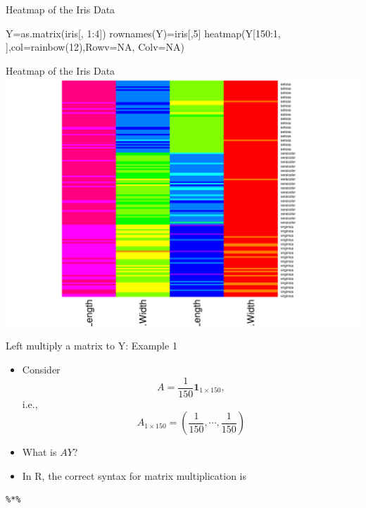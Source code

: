 \documentclass[
  ignorenonframetext,
]{beamer}
\newenvironment{Shaded}{\begin{snugshade}}{\end{snugshade}}
\newcommand{\AttributeTok}[1]{\textcolor[rgb]{0.77,0.63,0.00}{#1}}
\newcommand{\ConstantTok}[1]{\textcolor[rgb]{0.00,0.00,0.00}{#1}}
\newcommand{\DecValTok}[1]{\textcolor[rgb]{0.00,0.00,0.81}{#1}}
\newcommand{\FunctionTok}[1]{\textcolor[rgb]{0.00,0.00,0.00}{#1}}
\newcommand{\NormalTok}[1]{#1}
\newcommand{\OtherTok}[1]{\textcolor[rgb]{0.56,0.35,0.01}{#1}}
\newcommand{\SpecialCharTok}[1]{\textcolor[rgb]{0.00,0.00,0.00}{#1}}
\providecommand{\tightlist}{%
  \setlength{\itemsep}{0pt}\setlength{\parskip}{0pt}}
\begin{document}
\begin{frame}[fragile]{Heatmap of the Iris Data}
\protect\hypertarget{heatmap-of-the-iris-data}{}
\begin{Shaded}
\begin{Highlighting}[]
\NormalTok{Y}\OtherTok{=}\FunctionTok{as.matrix}\NormalTok{(iris[, }\DecValTok{1}\SpecialCharTok{:}\DecValTok{4}\NormalTok{])}
\FunctionTok{rownames}\NormalTok{(Y)}\OtherTok{=}\NormalTok{iris[,}\DecValTok{5}\NormalTok{]}
\FunctionTok{heatmap}\NormalTok{(Y[}\DecValTok{150}\SpecialCharTok{:}\DecValTok{1}\NormalTok{, ],}\AttributeTok{col=}\FunctionTok{rainbow}\NormalTok{(}\DecValTok{12}\NormalTok{),}\AttributeTok{Rowv=}\ConstantTok{NA}\NormalTok{, }\AttributeTok{Colv=}\ConstantTok{NA}\NormalTok{)}
\end{Highlighting}
\end{Shaded}
\end{frame}

\begin{frame}{Heatmap of the Iris Data}
\protect\hypertarget{heatmap-of-the-iris-data-1}{}
\includegraphics[width=0.6\linewidth]{Lecture02_MatrixOperations_files/figure-beamer/unnamed-chunk-10-1}
\end{frame}

\begin{frame}[fragile]{Left multiply a matrix to Y: Example 1}
\protect\hypertarget{left-multiply-a-matrix-to-y-example-1}{}
\begin{itemize}
\tightlist
\item
  Consider \[A=\frac{1}{150}\mathbf{1}_{1\times 150},\] i.e.,
  \[A_{1\times 150}=(\frac{1}{150}, \cdots, \frac{1}{150})\]
\item
  What is \(AY\)?
\item
  In R, the correct syntax for matrix multiplication is
\end{itemize}

\begin{verbatim}
%*%
\end{verbatim}
\end{frame}
\end{document}
